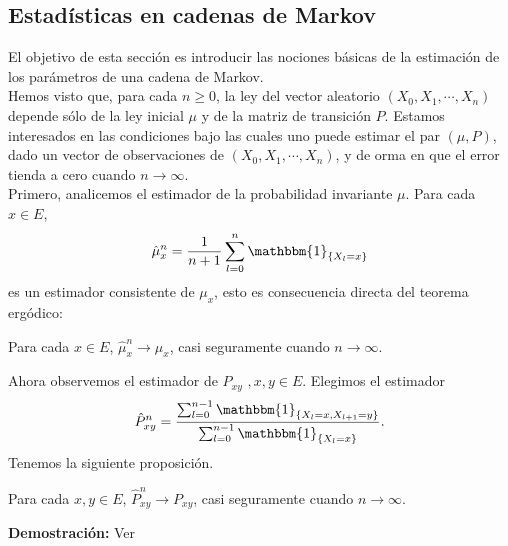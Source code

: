 \subsection{Estadísticas en cadenas de Markov}
El objetivo de esta sección es introducir las nociones básicas de la estimación de los parámetros de una cadena de Markov.\\
Hemos visto que, para cada $n\geq 0 $, la ley del vector aleatorio $(X_0,X_1,\cdots,X_n)$ depende sólo de la ley inicial $\mu$ y de la matriz de transición $P$. Estamos interesados en las condiciones bajo las cuales uno puede estimar el par $(\mu,P)$, dado un vector de observaciones de $(X_0,X_1,\cdots,X_n)$, y de orma en que el error tienda a cero cuando $n\rightarrow \infty$.\\
Primero, analicemos el estimador de la probabilidad invariante $\mu$. Para cada $x\in E$, 
\[\hat{\mu}_x^n = \frac{1}{n+1}\sum_{l=0}^n\mathbbm{1}_{\{X_l =x\}}\]
es un estimador consistente de $\mu_x$, esto es consecuencia directa del teorema ergódico:
\begin{prop}
Para cada $x\in E$, $\hat{\mu}_x^n \rightarrow \mu_x$, casi seguramente cuando $n\rightarrow \infty$.
\end{prop}

Ahora observemos el estimador de $P_{xy}$ $,x,y\in E$. Elegimos el estimador
\[\hat{P}_{xy}^n = \frac{\sum_{l=0}^{n-1}\mathbbm{1}_{\{X_l= x,X_{l+1}=y\}}}{\sum_{l=0}^{n-1}\mathbbm{1}_{\{X_l =x\}}}.\]
Tenemos la siguiente proposición.
\begin{prop}
Para cada $x,y\in E$, $\hat{P}_{xy}^n \rightarrow P_{xy}$, casi seguramente cuando $n\rightarrow \infty$.
\end{prop}

\textbf{Demostración: }Ver \cite[Pag. 43]{Pard}\\ \newline
